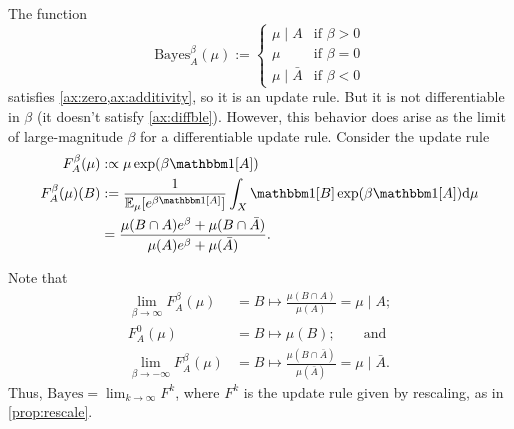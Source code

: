 \documentclass{article}
\begin{document}
The function
\[
	\mathrm{Bayes}^\beta_A(\mu) := \begin{cases}
			\mu \mid A &  \text{if }\beta > 0 \\
			\mu & \text{if } \beta = 0 \\
			\mu \mid \bar A &  \text{if } \beta < 0
		\end{cases}
\]
satisfies \cref{ax:zero,ax:additivity}, so it is an update rule.  But it is not differentiable in $\beta$ (it doesn't satisfy \cref{ax:diffble}).
However, this behavior does arise as the limit of large-magnitude $\beta$ for a differentiable update rule. Consider the update rule
\begin{align*}
	F^\beta_A (\mu) &:\propto \mu \exp(\beta \mathbbm1[A]) \\
	F^\beta_A (\mu)(B) &:=
		\frac{1}{\Ex_{\mu}[e^{\beta\mathbbm1[A]}]}\int_{X}  \mathbbm1[B] \exp(\beta \mathbbm1[A]) \mathrm d\mu \\
		&=
		\frac{\mu(B\cap A)e^{\beta} + \mu(B \cap \bar A) }
		{\mu(A)e^{\beta} + \mu(\bar A)}.
\end{align*}

Note that
\begin{align*}
\lim_{\beta\to\infty} F^\beta_A(\mu) &= B \mapsto \frac{\mu(B \cap A)}{\mu(A)}
   = \mu \mid A; \\
 F^0_A(\mu) &= B \mapsto \mu(B); \qquad\text{and}\\
\lim_{\beta\to-\infty} F^\beta_A(\mu) &= B \mapsto \frac{\mu(B \cap \bar A)}{\mu(\bar A)}
	  = \mu \mid \bar A.
\end{align*}
Thus, $\mathrm{Bayes} = \lim_{k \to \infty} F^{k}$, where $F^k$ is the update rule given by rescaling, as in \cref{prop:rescale}.
\end{document}
